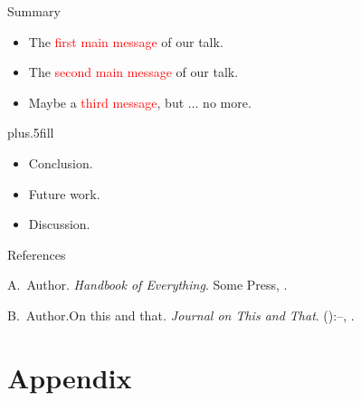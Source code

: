 \documentclass{beamer}
\begin{document}
\begin{frame}{Summary}
	\begin{itemize}
		\item The \textcolor{red}{first main message} of our talk.
		\item The \textcolor{red}{second main message} of our talk.
		\item Maybe a \textcolor{red}{third message}, but ... no more.
	\end{itemize}
	\vskip0pt plus.5fill
	\begin{itemize}
		\item Conclusion.
	\end{itemize}
	\begin{itemize}
		\item Future work.
		\item Discussion.
	\end{itemize}
\end{frame}

\begin{frame}{References}
	\begin{thebibliography}{2}
		\beamertemplatebookbibitems
		A.\ Author. \newblock\emph{Handbook of Everything}.\newblock
\textlatin{Some Press, }.

		\beamertemplatearticlebibitems
		B.\ Author.\newblock On this and that\emph{.}
\newblock\emph{Journal on This and That}. 
():--, 
.
	\end{thebibliography}
\end{frame}
\fi





\section{Appendix}
\end{document}
